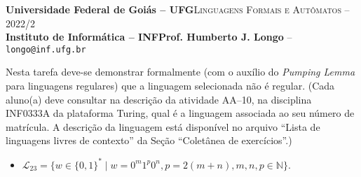 \documentclass[12pt]{article}
\def\discente{João Lucas Rodrigues Soares}
\def\matricula{202003580}
\def\ua{10}
\def\myling{{23}} %
\begin{document}
 \begin{tcolorbox}[rounded corners, colback=blue!3, colframe=blue!40!black]
  \footnotesize\textbf{Universidade Federal de Goiás -- UFG}\hfill \textsc{Linguagens Formais e Autômatos -- 2022/2}\\
  \footnotesize\textbf{Instituto de Informática -- INF\hfill Prof. Humberto J. Longo} -- \scriptsize\texttt{longo@inf.ufg.br}
 \end{tcolorbox}\bigskip
%
\begin{tcolorbox}[rounded corners, colback=blue!2, colframe=blue!40!black, title=\textbf{Atividade AA-\ua}]
  Nesta tarefa deve-se demonstrar formalmente (com o auxílio do \emph{Pumping Lemma} para linguagens regulares) que a linguagem selecionada não é regular. (Cada aluno(a) deve consultar na descrição da atividade AA--\ua, na disciplina INF0333A da plataforma Turing, qual é a linguagem associada ao seu número de matrícula. A descrição da linguagem está disponível no arquivo ``Lista de linguagens livres de contexto'' da Seção ``Coletânea de exercícios''.)
\end{tcolorbox}\bigskip
%
\begin{tcolorbox}[rounded corners, colback=yellow!5, colframe=red!40!black, title={\discente\ (\matricula)}]
 \begin{itemize}[leftmargin=*]
  \item $\mathcal{L}_\myling = \{w\in\{0,1\}^*\mid w = 0^m1^p0^n, p = 2 (m+n), m ,n ,p \in \mathbb{N}\}$.
 \end{itemize}
\end{tcolorbox}\bigskip
\end{document}
